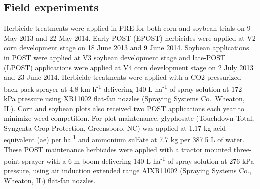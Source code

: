 \documentclass[agriculture,article,submit,moreauthors,pdftex]{mdpi}
\begin{document}
\hypertarget{field-experiments}{%
\subsection{Field experiments}\label{field-experiments}}

Herbicide treatments were applied in PRE for both corn and soybean
trials on 9 May 2013 and 22 May 2014. Early-POST (EPOST) herbicides were
applied at V2 corn development stage on 18 June 2013 and 9 June 2014.
Soybean applications in POST were applied at V3 soybean development
stage and late-POST (LPOST) applications were applied at V4 corn
development stage on 2 July 2013 and 23 June 2014. Herbicide treatments
were applied with a CO2-pressurized back-pack sprayer at 4.8 km
h\textsuperscript{-1} delivering 140 L ha\textsuperscript{-1} of spray
solution at 172 kPa pressure using XR11002 flat-fan nozzles (Spraying
Systems Co.~Wheaton, IL). Corn and soybean plots also received two POST
applications each year to minimize weed competition. For plot
maintenance, glyphosate (Touchdown Total, Syngenta Crop Protection,
Greensboro, NC) was applied at 1.17 kg acid equivalent (ae) per
ha\textsuperscript{-1} and ammonium sulfate at 7.7 kg per 387.5 L of
water. These POST maintenance herbicides were applied with a tractor
mounted three-point sprayer with a 6 m boom delivering 140 L
ha\textsuperscript{-1} of spray solution at 276 kPa pressure, using air
induction extended range AIXR11002 (Spraying Systems Co., Wheaton, IL)
flat-fan nozzles.
\end{document}
